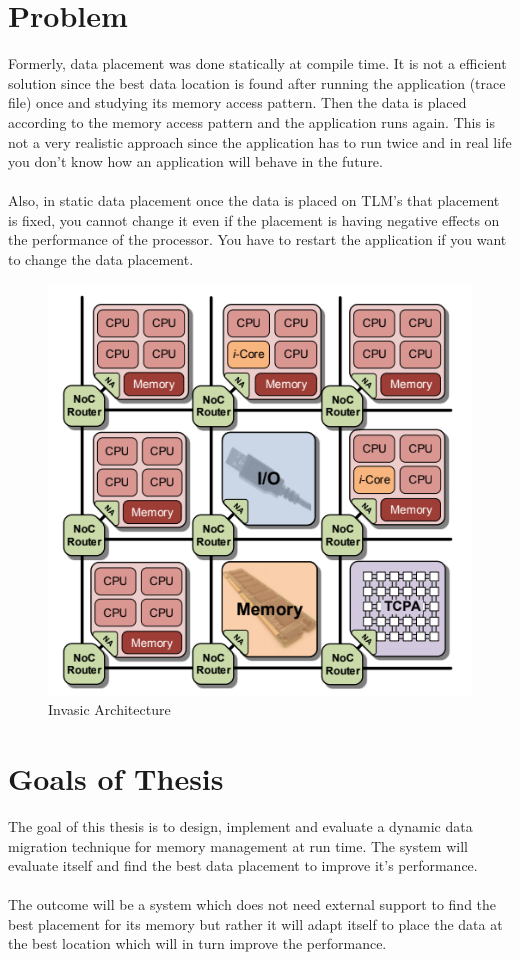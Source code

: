 \documentclass{listhesis}
\begin{document}
\section{Problem}
Formerly, data placement was done statically at compile time. It is not a efficient solution since the best data location is found after running the application (trace file) once and studying its memory access pattern. Then the data is placed according to the memory access pattern and the application runs again. This is not a very realistic approach since the application has to run twice and in real life you don't know how an application will behave in the future.\\
\\
Also, in static data placement once the data is placed on TLM's that placement is fixed, you cannot change it even if the placement is having negative effects on the performance of the processor. You have to restart the application if you want to change the data placement. 
\begin{figure}[h!]
  \includegraphics[width=0.7\linewidth]{multi-core,tile.png}
  \centering
  \caption{Invasic Architecture~\cite{iNetworkAdapter}}
  \label{fig:multi-core,tile}
\end{figure}
\section{Goals of Thesis}
The goal of this thesis is to design, implement and evaluate a dynamic data migration technique for memory management at run time. The system will evaluate itself and find the best data placement to improve it's performance. \\
\\
The outcome will be a system which does not need external support to find the best placement for its memory but rather it will adapt itself to place the data at the best location which will in turn improve the performance. 
\end{document}
